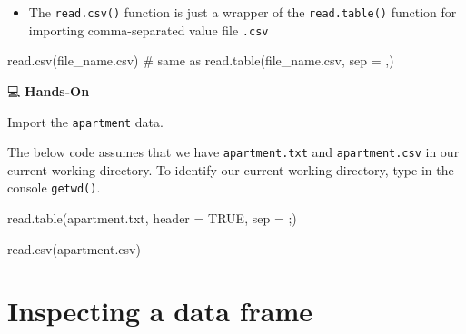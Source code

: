 \documentclass[
  letterpaper,
  DIV=11,
  numbers=noendperiod]{scrreprt}
\newenvironment{Shaded}{\begin{snugshade}}{\end{snugshade}}
\newcommand{\AttributeTok}[1]{\textcolor[rgb]{0.40,0.45,0.13}{#1}}
\newcommand{\CommentTok}[1]{\textcolor[rgb]{0.37,0.37,0.37}{#1}}
\newcommand{\ConstantTok}[1]{\textcolor[rgb]{0.56,0.35,0.01}{#1}}
\newcommand{\FunctionTok}[1]{\textcolor[rgb]{0.28,0.35,0.67}{#1}}
\newcommand{\NormalTok}[1]{\textcolor[rgb]{0.00,0.23,0.31}{#1}}
\newcommand{\StringTok}[1]{\textcolor[rgb]{0.13,0.47,0.30}{#1}}
\providecommand{\tightlist}{%
  \setlength{\itemsep}{0pt}\setlength{\parskip}{0pt}}\usepackage{longtable,booktabs,array}
\begin{document}
\begin{itemize}
\tightlist
\item
  The \texttt{read.csv()} function is just a wrapper of the
  \texttt{read.table()} function for importing comma-separated value
  file \texttt{.csv}
\end{itemize}

\begin{Shaded}
\begin{Highlighting}[]
\FunctionTok{read.csv}\NormalTok{(}\StringTok{\textquotesingle{}file\_name.csv\textquotesingle{}}\NormalTok{)    }\CommentTok{\# same as read.table(\textquotesingle{}file\_name.csv\textquotesingle{}, sep = \textquotesingle{},\textquotesingle{})}
\end{Highlighting}
\end{Shaded}

💻 \textbf{Hands-On}

Import the \texttt{apartment} data.

\begin{tcolorbox}[enhanced jigsaw, colbacktitle=quarto-callout-tip-color!10!white, opacitybacktitle=0.6, breakable, left=2mm, leftrule=.75mm, toprule=.15mm, toptitle=1mm, bottomtitle=1mm, colframe=quarto-callout-tip-color-frame, opacityback=0, coltitle=black, arc=.35mm, titlerule=0mm, colback=white, bottomrule=.15mm, title=\textcolor{quarto-callout-tip-color}{\faLightbulb}\hspace{0.5em}{Answer}, rightrule=.15mm]

The below code assumes that we have \texttt{apartment.txt} and
\texttt{apartment.csv} in our current working directory. To identify our
current working directory, type in the console \texttt{getwd()}.

\begin{Shaded}
\begin{Highlighting}[]
\FunctionTok{read.table}\NormalTok{(}\StringTok{\textquotesingle{}apartment.txt\textquotesingle{}}\NormalTok{, }\AttributeTok{header =} \ConstantTok{TRUE}\NormalTok{, }\AttributeTok{sep =} \StringTok{\textquotesingle{};\textquotesingle{}}\NormalTok{)}

\FunctionTok{read.csv}\NormalTok{(}\StringTok{\textquotesingle{}apartment.csv\textquotesingle{}}\NormalTok{)}
\end{Highlighting}
\end{Shaded}

\end{tcolorbox}

\section{Inspecting a data frame}\label{inspecting-a-data-frame}
\end{document}
